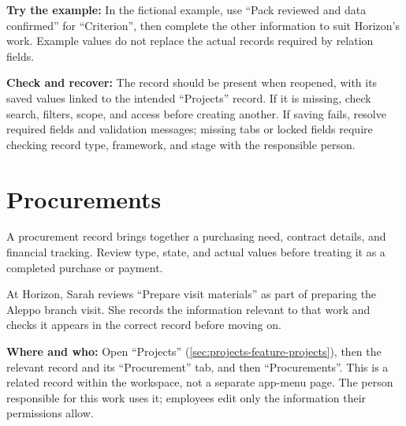 \textbf{Try the example:} In the fictional example, use “Pack reviewed and data confirmed” for “Criterion”, then complete the other information to suit Horizon's work. Example values do not replace the actual records required by relation fields.

\textbf{Check and recover:} The record should be present when reopened, with its saved values linked to the intended “Projects” record. If it is missing, check search, filters, scope, and access before creating another. If saving fails, resolve required fields and validation messages; missing tabs or locked fields require checking record type, framework, and stage with the responsible person.

\clearpage
\section{Procurements}
\label{sec:projects-feature-procurements}

A procurement record brings together a purchasing need, contract details, and financial tracking. Review type, state, and actual values before treating it as a completed purchase or payment.

\begin{rcnote}
At Horizon, Sarah reviews “Prepare visit materials” as part of preparing the Aleppo branch visit. She records the information relevant to that work and checks it appears in the correct record before moving on.
\end{rcnote}

\textbf{Where and who:} Open “Projects” (\ref{sec:projects-feature-projects}), then the relevant record and its “Procurement” tab, and then “Procurements”. This is a related record within the workspace, not a separate app-menu page. The person responsible for this work uses it; employees edit only the information their permissions allow.

